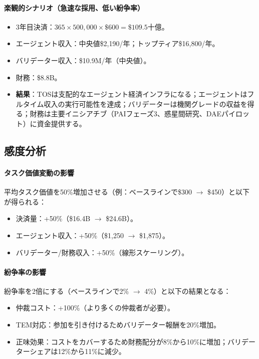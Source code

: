 \documentclass[11pt]{article}
\begin{document}
\paragraph{楽観的シナリオ（急速な採用、低い紛争率）}
\begin{itemize}[noitemsep]
  \item 3年目決済：$365 \times 500{,}000 \times \$600 = \$109.5$十億。
  \item エージェント収入：中央値\$2{,}190/年；トップティア\$16{,}800/年。
  \item バリデーター収入：\$10.9M/年（中央値）。
  \item 財務：\$8.8B。
  \item \textbf{結果}：TOSは支配的なエージェント経済インフラになる；エージェントはフルタイム収入の実行可能性を達成；バリデーターは機関グレードの収益を得る；財務は主要イニシアチブ（PAIフェーズ3、惑星間研究、DAEパイロット）に資金提供する。
\end{itemize}

\subsection{感度分析}
\paragraph{タスク価値変動の影響}
平均タスク価値を50\%増加させる（例：ベースラインで\$300 $\to$ \$450）と以下が得られる：
\begin{itemize}[noitemsep]
  \item 決済量：+50\%（\$16.4B $\to$ \$24.6B）。
  \item エージェント収入：+50\%（\$1{,}250 $\to$ \$1{,}875）。
  \item バリデーター/財務収入：+50\%（線形スケーリング）。
\end{itemize}

\paragraph{紛争率の影響}
紛争率を2倍にする（ベースラインで2\% $\to$ 4\%）と以下の結果となる：
\begin{itemize}[noitemsep]
  \item 仲裁コスト：+100\%（より多くの仲裁者が必要）。
  \item TEM対応：参加を引き付けるためバリデーター報酬を20\%増加。
  \item 正味効果：コストをカバーするため財務配分が8\%から10\%に増加；バリデーターシェアは12\%から11\%に減少。
\end{itemize}
\end{document}
